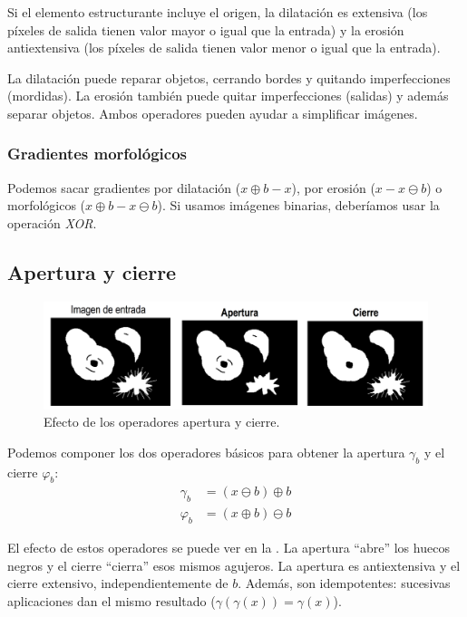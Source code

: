 \documentclass[nochap,palatino]{apuntes}
\begin{document}
Si el elemento estructurante incluye el origen, la dilatación es extensiva (los píxeles de salida tienen valor mayor o igual que la entrada) y la erosión antiextensiva (los píxeles de salida tienen valor menor o igual que la entrada).

La dilatación puede reparar objetos, cerrando bordes y quitando imperfecciones (mordidas). La erosión también puede quitar imperfecciones (salidas) y además separar objetos. Ambos operadores pueden ayudar a simplificar imágenes.

\subsubsection{Gradientes morfológicos}

Podemos sacar gradientes por dilatación ($x \oplus b - x$), por erosión ($x - x \ominus b$) o morfológicos ($x\oplus b - x \ominus b$). Si usamos imágenes binarias, deberíamos usar la operación \textit{XOR}.

\subsection{Apertura y cierre}

\begin{figure}[hbtp]
\centering
\includegraphics[width=\textwidth]{img/AperturaCierre.png}
\caption{Efecto de los operadores apertura y cierre.}
\label{fig:AperturaCierre}
\end{figure}

Podemos componer los dos operadores básicos para obtener la apertura $γ_b$ y el cierre $φ_b$: \begin{align*}
γ_b &= (x \ominus b) \oplus b \\
φ_b &= (x \oplus b) \ominus b
\end{align*}

El efecto de estos operadores se puede ver en la . La apertura ``abre'' los huecos negros y el cierre ``cierra'' esos mismos agujeros. La apertura es antiextensiva y el cierre extensivo, independientemente de $b$. Además, son idempotentes: sucesivas aplicaciones dan el mismo resultado ($γ(γ(x)) = γ(x)$).
\end{document}
